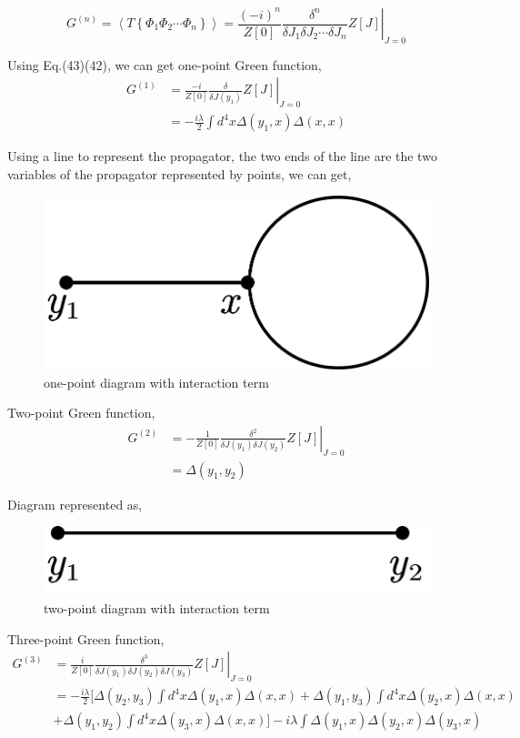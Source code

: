 \documentclass[a4paper]{article}
\begin{document}
\begin{equation}
    G^{(n)}=\left.\left<T\left\{\Phi_{1}\Phi_{2}\cdots\Phi_{n}\right\}\right>=\frac{(-i)^n}{Z[0]}\frac{\delta^n}{\delta J_{1}\delta J_{2}\cdots\delta J_{n}}Z[J]\right|_{J=0}
\end{equation}
\par Using Eq.(43)(42), we can get one-point Green function,
\begin{equation}
    \begin{split}
        G^{(1)}&=\left.\frac{-i}{Z[0]}\frac{\delta}{\delta J(y_{1})}Z[J]\right|_{J=0}\\
        &=-\frac{i\lambda}{2}\int{d^4x \Delta(y_{1},x)\Delta(x,x)}
    \end{split}
\end{equation}
\par Using a line to represent the propagator, the two ends of the line are the two variables of the propagator represented by points, we can get,
\begin{figure}[h]
    \centering
    \includegraphics[width=0.4\linewidth]{1point.png}
    \caption{one-point diagram with interaction term}
    \label{fig:enter-label}
\end{figure}
\par Two-point Green function,
\begin{equation}
    \begin{split}
         G^{(2)}&=\left.-\frac{1}{Z[0]}\frac{\delta^2}{\delta J(y_{1})\delta J(y_{2})}Z[J]\right|_{J=0}\\
         &=\Delta(y_{1},y_{2})
    \end{split}
\end{equation}
\par Diagram represented as,
\begin{figure}[h]
    \centering
    \includegraphics[width=0.3\linewidth]{2point.png}
    \caption{two-point diagram with interaction term}
    \label{fig:enter-label}
\end{figure}
\par Three-point Green function,
\begin{equation}
    \begin{split}
        G^{(3)}&=\left.\frac{i}{Z[0]}\frac{\delta^3}{\delta J(y_{1})\delta J(y_{2})\delta J(y_{3})}Z[J]\right|_{J=0}\\
         &=-\frac{i\lambda}{2}[\Delta(y_{2},y_{3})\int{d^4x \Delta(y_{1},x)\Delta(x,x)}+\Delta(y_{1},y_{3})\int{d^4x \Delta(y_{2},x)\Delta(x,x)}\\
         &+\Delta(y_{1},y_{2})\int{d^4x \Delta(y_{3},x)\Delta(x,x)}]-i\lambda\int{\Delta(y_{1},x)\Delta(y_{2},x)\Delta(y_{3},x)}
    \end{split}
\end{equation}
\end{document}
